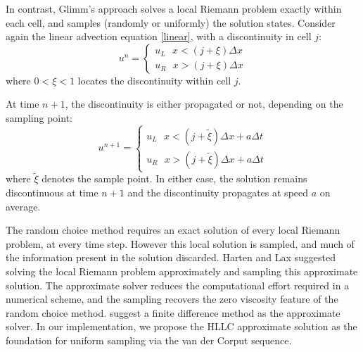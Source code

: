 \documentclass[preprint,12pt,authoryear]{elsarticle}
\begin{document}
In contrast, Glimm\rq{}s approach solves a local Riemann problem exactly within each cell,
and samples (randomly or uniformly) the solution states. Consider again the linear advection equation \ref{linear}, with a discontinuity in cell $j$:
\begin{equation}
u^n = \begin{cases}
	u_L ~~~ x< (j+\xi)\Delta x \\
 	u_R ~~~ x> (j+\xi)\Delta x
	\end{cases}			
\end{equation}
where $0<\xi<1$ locates the discontinuity within cell $j$.

At time $n+1$, the discontinuity is either propagated or not, depending on the sampling
point:
\begin{equation}
u^{n+1} = \begin{cases}
		  u_L ~~~ x< (j+\tilde \xi)\Delta x + a \Delta t \\
		  u_R ~~~ x> (j+\tilde \xi)\Delta x + a \Delta t
	        \end{cases}
\end{equation}
where $\tilde \xi$ denotes the sample point.
In either case, the solution remains discontinuous at time $n+1$ and the 
discontinuity propagates at speed $a$ on average.

The random choice method requires an exact solution of every local Riemann problem, at every time step.
However this local solution is sampled, and much of the information present in the solution discarded.
Harten and Lax \citet{harten1981random} suggested solving the local Riemann problem approximately 
and sampling this approximate solution. The approximate solver reduces the computational
effort required in a numerical scheme, and the sampling recovers the zero viscosity
feature of the random choice method. \citet{hartenlax} suggest a finite difference
method as the approximate solver.
In our implementation, we propose the HLLC approximate solution as the foundation for
uniform sampling via the van der Corput sequence.
\citep{glimm1965solutions}
\citep{colella1982glimm}
\citep{chorin1976random}
\citep{concus1979numerical}
\citep{warming1974modified}
\citep{liu1977deterministic}

\end{document}
